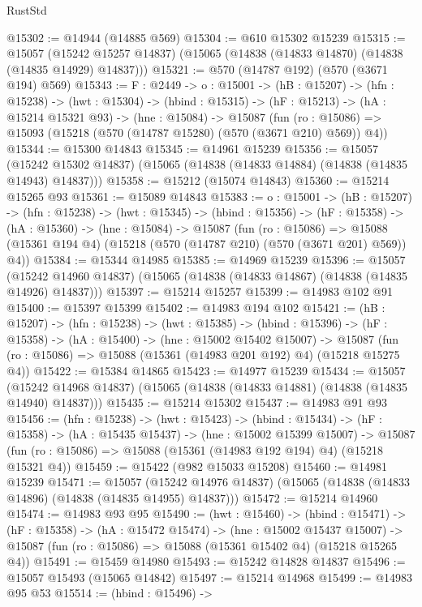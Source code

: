 \begin{lexlean}{RustStd}
\begin{coremodule}
@15302 := @14944 (@14885 @569)
@15304 := @610 @15302 @15239
@15315 := @15057
    (@15242 @15257 @14837)
    (@15065 (@14838 (@14833 @14870) (@14838 (@14835 @14929) @14837)))
@15321 := @570 (@14787 @192) (@570 (@3671 @194) @569)
@15343 := {F : @2449} ->
  {o : @15001} ->
  (hB : @15207) ->
  (hfn : @15238) ->
  (hwt : @15304) ->
  (hbind : @15315) ->
  (hF : @15213) ->
  (hA : @15214 @15321 @93) ->
  (hne : @15084) ->
  @15087 (fun (ro : @15086) => @15093 (@15218 (@570 (@14787 @15280) (@570 (@3671 @210) @569)) @4))
@15344 := @15300 @14843
@15345 := @14961 @15239
@15356 := @15057
    (@15242 @15302 @14837)
    (@15065 (@14838 (@14833 @14884) (@14838 (@14835 @14943) @14837)))
@15358 := @15212 (@15074 @14843)
@15360 := @15214 @15265 @93
@15361 := @15089 @14843
@15383 := {o : @15001} ->
  (hB : @15207) ->
  (hfn : @15238) ->
  (hwt : @15345) ->
  (hbind : @15356) ->
  (hF : @15358) ->
  (hA : @15360) ->
  (hne : @15084) ->
  @15087
    (fun (ro : @15086) =>
    @15088 (@15361 @194 @4) (@15218 (@570 (@14787 @210) (@570 (@3671 @201) @569)) @4))
@15384 := @15344 @14985
@15385 := @14969 @15239
@15396 := @15057
    (@15242 @14960 @14837)
    (@15065 (@14838 (@14833 @14867) (@14838 (@14835 @14926) @14837)))
@15397 := @15214 @15257
@15399 := @14983 @102 @91
@15400 := @15397 @15399
@15402 := @14983 @194 @102
@15421 := (hB : @15207) ->
  (hfn : @15238) ->
  (hwt : @15385) ->
  (hbind : @15396) ->
  (hF : @15358) ->
  (hA : @15400) ->
  (hne : @15002 @15402 @15007) ->
  @15087 (fun (ro : @15086) => @15088 (@15361 (@14983 @201 @192) @4) (@15218 @15275 @4))
@15422 := @15384 @14865
@15423 := @14977 @15239
@15434 := @15057
    (@15242 @14968 @14837)
    (@15065 (@14838 (@14833 @14881) (@14838 (@14835 @14940) @14837)))
@15435 := @15214 @15302
@15437 := @14983 @91 @93
@15456 := (hfn : @15238) ->
  (hwt : @15423) ->
  (hbind : @15434) ->
  (hF : @15358) ->
  (hA : @15435 @15437) ->
  (hne : @15002 @15399 @15007) ->
  @15087 (fun (ro : @15086) => @15088 (@15361 (@14983 @192 @194) @4) (@15218 @15321 @4))
@15459 := @15422 (@982 @15033 @15208)
@15460 := @14981 @15239
@15471 := @15057
    (@15242 @14976 @14837)
    (@15065 (@14838 (@14833 @14896) (@14838 (@14835 @14955) @14837)))
@15472 := @15214 @14960
@15474 := @14983 @93 @95
@15490 := (hwt : @15460) ->
  (hbind : @15471) ->
  (hF : @15358) ->
  (hA : @15472 @15474) ->
  (hne : @15002 @15437 @15007) ->
  @15087 (fun (ro : @15086) => @15088 (@15361 @15402 @4) (@15218 @15265 @4))
@15491 := @15459 @14980
@15493 := @15242 @14828 @14837
@15496 := @15057 @15493 (@15065 @14842)
@15497 := @15214 @14968
@15499 := @14983 @95 @53
@15514 := (hbind : @15496) ->

\end{coremodule}
\end{lexlean}
